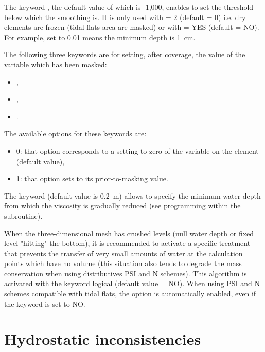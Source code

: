 The keyword , the default value of which is
-1,000, enables to set the threshold below which the smoothing is.
It is only used with  = 2
(default = 0)
i.e. dry elements are frozen (tidal flats area are masked)
or with  = YES (default = NO).
For example,
 set to 0.01 means the minimum depth is 1~cm.

The following three keywords are for setting, after coverage, the value of the
variable which has been masked:

\begin{itemize}
\item {},

\item {},

\item {}.
\end{itemize}

The available options for these keywords are:

\begin{itemize}
\item 0: that option corresponds to a setting to zero of the variable on the
element (default value),

\item 1: that option sets to its prior-to-masking value.
\end{itemize}

The keyword  (default
value is 0.2~m) allows to specify the minimum water depth from which the
viscosity is gradually reduced (see programming within the 
subroutine).

When the three-dimensional mesh has crushed levels (null water depth or fixed
level "hitting" the bottom), it is recommended to activate a specific treatment
that prevents the transfer of very small amounts of water at the calculation
points which have no volume (this situation also tends to degrade the mass
conservation when using distributives PSI and N schemes). This algorithm is
activated with the keyword logical 
(default value = NO). When using PSI
and N schemes compatible with tidal flats, the option is automatically enabled,
even if the keyword is set to NO.

\section{Hydrostatic inconsistencies}

